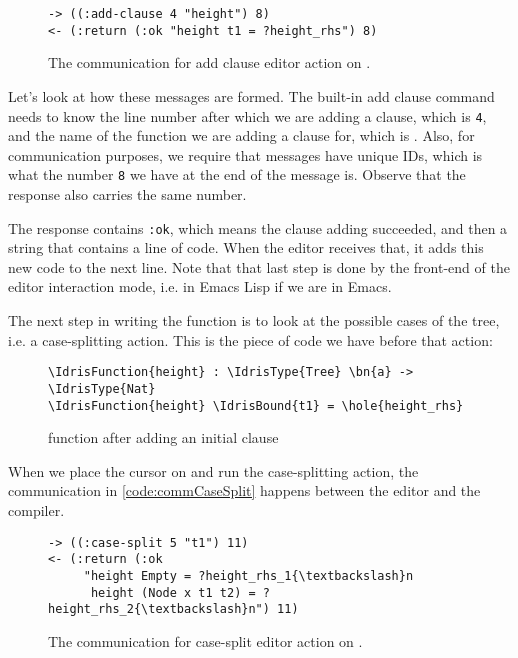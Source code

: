 \begin{figure}[ht]
  \caption{The communication for add clause editor action on .}
  \label{code:commAddClause}
\begin{Verbatim}[framesep=2mm, label=\footnotesize{\normalfont{S-expression}}, labelposition=topline]
-> ((:add-clause 4 "height") 8)
<- (:return (:ok "height t1 = ?height_rhs") 8)
\end{Verbatim}
\end{figure}

Let's look at how these messages are formed. The built-in add clause command
needs to know the line number after which we are adding a clause, which is
\texttt{4}, and the name of the function we are adding a clause for, which is
.
Also, for communication purposes, we require that messages have unique IDs,
which is what the number \texttt{8} we have at the end of the message is.
Observe that the response also carries the same number.

The response contains \texttt{:ok}, which means the clause adding succeeded,
and then a string that contains a line of code.
When the editor receives that, it adds this new code to the next
line. Note that that last step is done by the front-end of the editor
interaction mode, i.e. in Emacs Lisp if we are in Emacs.

The next step in writing the function  is to look at the possible
cases of the tree, i.e. a case-splitting action. This is the piece of code we
have before that action:

\begin{figure}[ht]
  \caption{ function after adding an initial clause}
\begin{Verbatim}[framesep=2mm, label=\footnotesize{\normalfont{Idris}}, labelposition=topline]
\IdrisFunction{height} : \IdrisType{Tree} \bn{a} -> \IdrisType{Nat}
\IdrisFunction{height} \IdrisBound{t1} = \hole{height_rhs}
\end{Verbatim}
\end{figure}

\noindent When we place the cursor on  and run the case-splitting action, the
communication in \autoref{code:commCaseSplit} happens between the editor and
the compiler.

\begin{figure}[ht]
\caption{The communication for case-split editor action on .}
\label{code:commCaseSplit}
\begin{Verbatim}[framesep=2mm, label=\footnotesize{\normalfont{S-expression}}, labelposition=topline]
-> ((:case-split 5 "t1") 11)
<- (:return (:ok
     "height Empty = ?height_rhs_1{\textbackslash}n
      height (Node x t1 t2) = ?height_rhs_2{\textbackslash}n") 11)
\end{Verbatim}
\end{figure}

